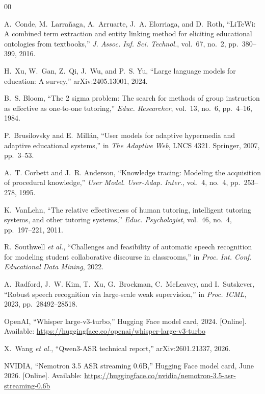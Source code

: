 \documentclass[conference]{IEEEtran}
\begin{document}
\begin{thebibliography}{00}

A.~Conde, M.~Larra{\~n}aga, A.~Arruarte, J.~A. Elorriaga, and D.~Roth, ``{LiTeWi}: A combined term extraction and entity linking method for eliciting educational ontologies from textbooks,'' \emph{J. Assoc. Inf. Sci. Technol.}, vol.~67, no.~2, pp.~380--399, 2016.

H.~Xu, W.~Gan, Z.~Qi, J.~Wu, and P.~S. Yu, ``Large language models for education: A survey,'' arXiv:2405.13001, 2024.

B.~S. Bloom, ``The 2 sigma problem: The search for methods of group instruction as effective as one-to-one tutoring,'' \emph{Educ. Researcher}, vol.~13, no.~6, pp.~4--16, 1984.

P.~Brusilovsky and E.~Mill{\'a}n, ``User models for adaptive hypermedia and adaptive educational systems,'' in \emph{The Adaptive Web}, LNCS 4321. Springer, 2007, pp.~3--53.

A.~T. Corbett and J.~R. Anderson, ``Knowledge tracing: Modeling the acquisition of procedural knowledge,'' \emph{User Model. User-Adap. Inter.}, vol.~4, no.~4, pp.~253--278, 1995.

K.~VanLehn, ``The relative effectiveness of human tutoring, intelligent tutoring systems, and other tutoring systems,'' \emph{Educ. Psychologist}, vol.~46, no.~4, pp.~197--221, 2011.

R.~Southwell \emph{et al.}, ``Challenges and feasibility of automatic speech recognition for modeling student collaborative discourse in classrooms,'' in \emph{Proc. Int. Conf. Educational Data Mining}, 2022.

A.~Radford, J.~W. Kim, T.~Xu, G.~Brockman, C.~McLeavey, and I.~Sutskever, ``Robust speech recognition via large-scale weak supervision,'' in \emph{Proc. ICML}, 2023, pp.~28492--28518.

OpenAI, ``{Whisper large-v3-turbo},'' Hugging Face model card, 2024. [Online]. Available: \url{https://huggingface.co/openai/whisper-large-v3-turbo}

X.~Wang \emph{et al.}, ``{Qwen3-ASR} technical report,'' arXiv:2601.21337, 2026.

NVIDIA, ``{Nemotron 3.5 ASR} streaming 0.6B,'' Hugging Face model card, June 2026. [Online]. Available: \url{https://huggingface.co/nvidia/nemotron-3.5-asr-streaming-0.6b}


\end{thebibliography}
\end{document}
